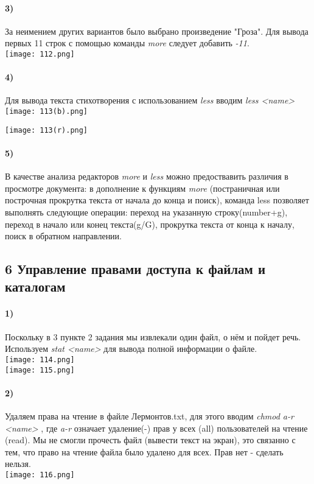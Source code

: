 		\paragraph{3)}
		За неимением других вариантов было выбрано произведение "Гроза". Для вывода 	первых 11 строк с помощью команды \textit{more} следует добавить \textit{-11}.
	\\
	\texttt{[image: 112.png]}
	\\
		\paragraph{4)}
		Для вывода текста стихотворения с использованием \textit{less} вводим 			\textit{less <name>}\\
	\texttt{[image: 113(b).png]}
	\\
	\begin{center}
		\texttt{[image: 113(r).png]}
	\end{center}
	
		\paragraph{5)}
		В качестве анализа редакторов \textit{more} и \textit{less} можно 				предоствавить различия в просмотре документа: в дополнение к функциям 				\textit{more}  (постраничная или построчная прокрутка текста от начала до конца 	и поиск), команда less позволяет выполнять следующие операции: переход на 			указанную строку(number+g), переход в начало или  конец текста(g/G), прокрутка 		текста от конца к началу, поиск в обратном направлении.\\
		
	\subsection*{6 Управление правами доступа к файлам и каталогам}
	
		\paragraph{1)}
		Поскольку в 3 пункте 2 задания мы извлекали один файл, о нём и пойдет речь. 	Используем \textit{stat <name>} для вывода полной информации о файле. \\
	\texttt{[image: 114.png]}
	\\
	\texttt{[image: 115.png]}
	\\
		\paragraph{2)}
		Удаляем права на чтение в файле Лермонтов.txt, для 			этого вводим \textit{chmod a-r <name> }, где \textit{a-r} означает удаление(-) 		прав у всех (all)  пользователей на чтение (read). Мы не смогли прочесть файл (вывести текст на экран), это связанно с тем, что право на чтение файла было удалено для всех. 
	Прав нет - сделать нельзя.\\
	\texttt{[image: 116.png]}
	\\
